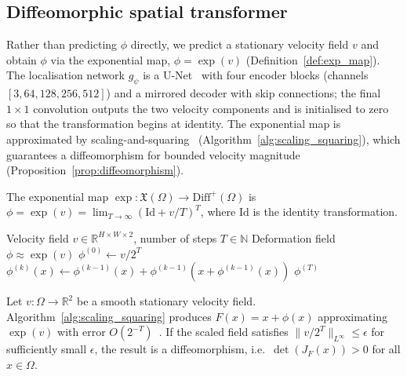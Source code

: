 \subsection{Diffeomorphic spatial transformer}

Rather than predicting $\phi$ directly, we predict a stationary velocity field
$v$ and obtain $\phi$ via the exponential map, $\phi=\exp(v)$
(Definition~\ref{def:exp_map}). The localisation network $g_\psi$ is a
U-Net~\cite{ronneberger2015unet} with four encoder blocks (channels
$[3,64,128,256,512]$) and a mirrored decoder with skip connections; the final
$1\times1$ convolution outputs the two velocity components and is initialised to
zero so that the transformation begins at identity. The exponential map is
approximated by scaling-and-squaring~\cite{arsigny2006logdiff}
(Algorithm~\ref{alg:scaling_squaring}), which guarantees a diffeomorphism for
bounded velocity magnitude (Proposition~\ref{prop:diffeomorphism}).

\begin{definition}
\label{def:exp_map}
The exponential map $\exp:\mathfrak{X}(\Omega)\rightarrow\text{Diff}^+(\Omega)$ is
$\phi=\exp(v)=\lim_{T\rightarrow\infty}\left(\text{Id}+v/T\right)^T$, where
$\text{Id}$ is the identity transformation.
\end{definition}

\begin{algorithm}[t]
\caption{Scaling-and-Squaring for Diffeomorphic Integration}
\label{alg:scaling_squaring}
\begin{algorithmic}[1]
\REQUIRE Velocity field $v \in \mathbb{R}^{H \times W \times 2}$, number of steps $T \in \mathbb{N}$
\ENSURE Deformation field $\phi \approx \exp(v)$
\STATE $\phi^{(0)} \leftarrow v / 2^T$ \quad {}
    \STATE $\phi^{(k)}(x) \leftarrow \phi^{(k-1)}(x) + \phi^{(k-1)}(x + \phi^{(k-1)}(x))$ \quad {}
\ENDFOR
\RETURN $\phi^{(T)}$
\end{algorithmic}
\end{algorithm}


\begin{proposition}
\label{prop:diffeomorphism}
Let $v:\Omega\rightarrow\mathbb{R}^2$ be a smooth stationary velocity field.
Algorithm~\ref{alg:scaling_squaring} produces $F(x)=x+\phi(x)$ approximating
$\exp(v)$ with error $O(2^{-T})$~\cite{arsigny2006logdiff}. If the scaled field
satisfies $\|v/2^T\|_{L^\infty}\leq\epsilon$ for sufficiently small $\epsilon$,
the result is a diffeomorphism, i.e.\ $\det(J_F(x))>0$ for all $x\in\Omega$.
\end{proposition}

